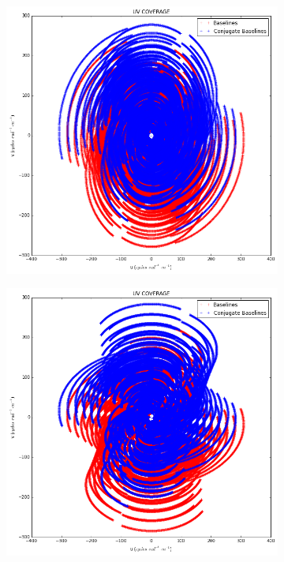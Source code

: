 \begin{figure}[h]
\begin{mdframed}
\begin{subfigure}[b]{0.32\textwidth}
  \caption{}
 \end{subfigure}
 \begin{subfigure}[b]{0.32\textwidth}
  \includegraphics[width=\textwidth]{images/evla_observation/6hr_dec60.png}
  \caption{}
 \end{subfigure}
 \begin{subfigure}[b]{0.32\textwidth}
  \includegraphics[width=\textwidth]{images/evla_observation/6hr_dec30.png}

\end{subfigure}
\end{mdframed}
\end{figure}
